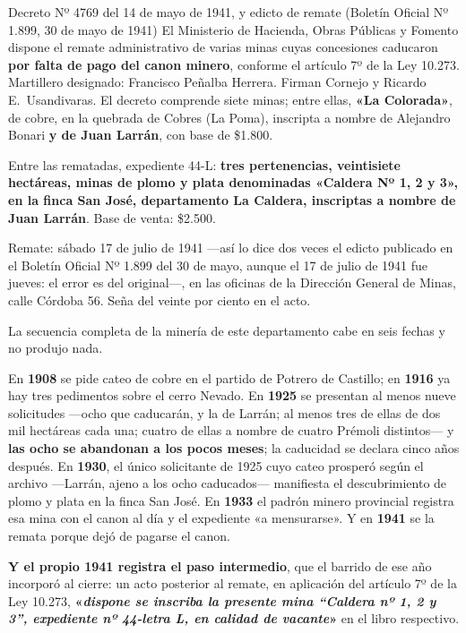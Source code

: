 \begin{ficha}{Decreto Nº 4769 del 14 de mayo de 1941, y edicto de remate (Boletín Oficial Nº 1.899, 30 de mayo de 1941)}
El Ministerio de Hacienda, Obras Públicas y Fomento dispone el remate administrativo de
varias minas cuyas concesiones caducaron \textbf{por falta de pago del canon minero},
conforme el artículo 7º de la Ley 10.273. Martillero designado: Francisco Peñalba Herrera.
Firman Cornejo y Ricardo E.\ Usandivaras. El decreto comprende siete minas; entre ellas, \textbf{«La Colorada»}, de cobre, en la quebrada de Cobres (La Poma), inscripta a nombre de Alejandro Bonari \textbf{y de Juan Larrán}, con base de \$1.800.

Entre las rematadas, expediente 44-L: \textbf{tres pertenencias, veintisiete hectáreas, minas
de plomo y plata denominadas «Caldera Nº 1, 2 y 3», en la finca San José, departamento La
Caldera, inscriptas a nombre de Juan Larrán}. Base de venta: \$2.500.

Remate: sábado 17 de julio de 1941 ---así lo dice dos veces el edicto publicado en el Boletín Oficial Nº 1.899 del 30 de mayo, aunque el 17 de julio de 1941 fue jueves: el error es del original---, en las oficinas de la Dirección General de Minas, calle
Córdoba 56. Seña del veinte por ciento en el acto.
\end{ficha}

La secuencia completa de la minería de este departamento cabe en seis fechas y no produjo
nada.

En \textbf{1908} se pide cateo de cobre en el partido de Potrero de Castillo; en \textbf{1916} ya hay tres pedimentos sobre el cerro Nevado. En \textbf{1925}
se presentan al menos nueve solicitudes ---ocho que caducarán, y la de Larrán; al menos tres de ellas de dos mil hectáreas cada una; cuatro de ellas a nombre de
cuatro Prémoli distintos--- y \textbf{las ocho se abandonan a los pocos meses}; la caducidad se
declara cinco años después. En \textbf{1930}, el único solicitante de 1925 cuyo cateo
prosperó según el archivo ---Larrán, ajeno a los ocho caducados--- manifiesta el descubrimiento de plomo y plata en la finca San José. En \textbf{1933}
el padrón minero provincial registra esa mina con el canon al día y el expediente «a
mensurarse». Y en \textbf{1941} se la remata porque dejó de pagarse el canon.

\textbf{Y el propio 1941 registra el paso intermedio}, que el barrido de ese año incorporó al
cierre: un acto posterior al remate, en aplicación del artículo 7º de la Ley 10.273,
\textbf{«\textit{dispone se inscriba la presente mina “Caldera nº 1, 2 y 3”, expediente
nº 44-letra L, en calidad de \textbf{vacante}}»} en el libro respectivo.

